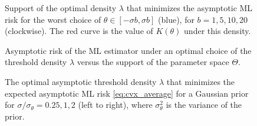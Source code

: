 \documentclass[letterpaper, conference]{IEEEtran}      %
\begin{document}
\begin{figure}
\begin{center}
\caption{\label{fig:cvx}
Support of the optimal density $\lambda$ that minimizes the asymptotic ML risk for the worst choice of $\theta \in [-\sigma b, \sigma b]$ (blue), for $b=1,5,10,20$ (clockwise). The red curve is the value of $K(\theta)$ under this density. 
}
\end{center}
\end{figure}


\begin{figure}
\begin{center}
\caption{\label{fig:cvx2}
Asymptotic risk of the ML estimator under an optimal choice of the threshold density $\lambda$ versus the support of the parameter space $\Theta$.
}
\end{center}
\end{figure}

\begin{figure}
\begin{center}
\caption{\label{fig:opt_density}
The optimal asymptotic threshold density $\lambda$ that minimizes the expected asymptotic ML risk \eqref{eq:cvx_average} for a Gaussian prior for
 $\sigma/\sigma_\theta=0.25,1,2$ (left to right), where $\sigma_\theta^2$ is the variance of the prior. 
}
\end{center}
\end{figure}
\end{document}
